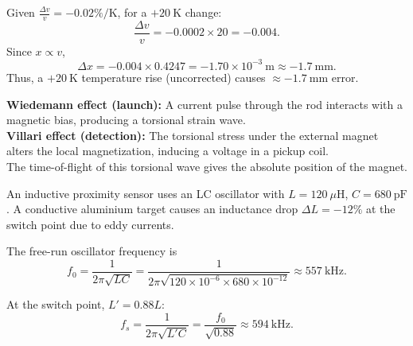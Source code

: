 

\begin{solutionblock}
Given $ \frac{\Delta v}{v} = -0.02\%\!/\text{K}$, for a $+20~\text{K}$ change:
\[
\frac{\Delta v}{v} = -0.0002 \times 20 = -0.004.
\]
Since $x \propto v$, 
\[
\Delta x = -0.004 \times 0.4247 = -1.70\times10^{-3}~\text{m} 
\approx -1.7~\text{mm.}
\]
Thus, a $+20~\text{K}$ temperature rise (uncorrected) causes $\approx -1.7~\text{mm}$ error.
\end{solutionblock}




\begin{solutionblock}
\textbf{Wiedemann effect (launch):} A current pulse through the rod interacts with a magnetic bias, producing a torsional strain wave. \\
\textbf{Villari effect (detection):} The torsional stress under the external magnet alters the local magnetization, inducing a voltage in a pickup coil. \\
The time-of-flight of this torsional wave gives the absolute position of the magnet.
\end{solutionblock}






An inductive proximity sensor uses an LC oscillator with $L = 120~\mu\text{H}$, $C = 680~\text{pF}$.  
A conductive aluminium target causes an inductance drop $\Delta L = -12\%$ at the switch point due to eddy currents.



\begin{solutionblock}
The free-run oscillator frequency is
\[
f_0 = \frac{1}{2\pi\sqrt{LC}}
     = \frac{1}{2\pi\sqrt{120\times10^{-6}\times680\times10^{-12}}}
     \approx 557~\text{kHz.}
\]

At the switch point, $L' = 0.88L$:
\[
f_s = \frac{1}{2\pi\sqrt{L'C}}
     = \frac{f_0}{\sqrt{0.88}}
     \approx 594~\text{kHz.}
\]
\end{solutionblock}




